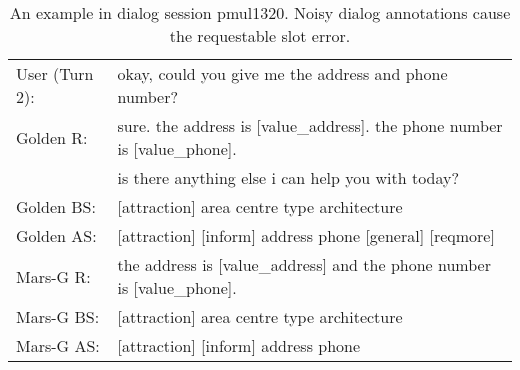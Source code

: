 \begin{table*}[ht]
{\begin{tabular}{ll}
  	\midrule
 User (Turn 2):  & okay, {\color{red}could you give me the address and phone number?}	\\
  	Golden R: & sure. the address is [value\_address]. the phone number is [value\_phone].\\& is there anything else i can help you with today? \\
  	Golden BS: & [attraction] area centre type architecture \\
Golden AS:&      [attraction] {\color{red}[inform] address phone} [general] [reqmore] \\
  	  Mars-G R: & the address is [value\_address] and the phone number is [value\_phone]. \\
  	 Mars-G BS: & [attraction] area centre type architecture\\
  Mars-G AS:&     [attraction] {\color{red}[inform] address phone}  \\
           
  	 

    
		\bottomrule
	\end{tabular}}\caption{An example in dialog session pmul1320. Noisy dialog annotations cause the requestable slot error. \label{tab:case9}}
\end{table*}


